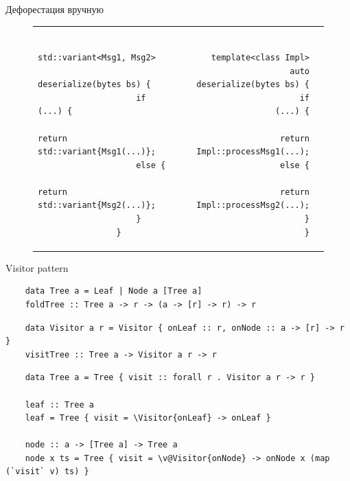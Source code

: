     \begin{frame}[fragile]{Дефорестация вручную}
        \pause
        \begin{figure}
            \centering
            \begin{tabular}{p{} rl}
                \begin{minipage}[t]{0.5\textwidth}
                    \begin{verbatim}
                std::variant<Msg1, Msg2>
                    deserialize(bytes bs) {
                    if (...) {
                        return std::variant{Msg1(...)};
                    else {
                        return std::variant{Msg2(...)};
                    }
                }
                    \end{verbatim}
                \end{minipage}
                &
                \begin{minipage}[t]{0.5\textwidth}
                    \begin{verbatim}
                template<class Impl>
                auto deserialize(bytes bs) {
                    if (...) {
                        return Impl::processMsg1(...);
                    else {
                        return Impl::processMsg2(...);
                    }
                }
                    \end{verbatim}
                \end{minipage}
            \end{tabular}
        \end{figure}
    \end{frame}

    \begin{frame}[fragile]{Visitor pattern}
        \pause
        \begin{verbatim}
    data Tree a = Leaf | Node a [Tree a]
    foldTree :: Tree a -> r -> (a -> [r] -> r) -> r
        \end{verbatim}
        \pause\vspace{1em}
        \begin{verbatim}
    data Visitor a r = Visitor { onLeaf :: r, onNode :: a -> [r] -> r }
    visitTree :: Tree a -> Visitor a r -> r
        \end{verbatim}
        \pause\vspace{1em}
        \begin{verbatim}
    data Tree a = Tree { visit :: forall r . Visitor a r -> r }

    leaf :: Tree a
    leaf = Tree { visit = \Visitor{onLeaf} -> onLeaf }

    node :: a -> [Tree a] -> Tree a
    node x ts = Tree { visit = \v@Visitor{onNode} -> onNode x (map (`visit` v) ts) }
        \end{verbatim}
    \end{frame}

